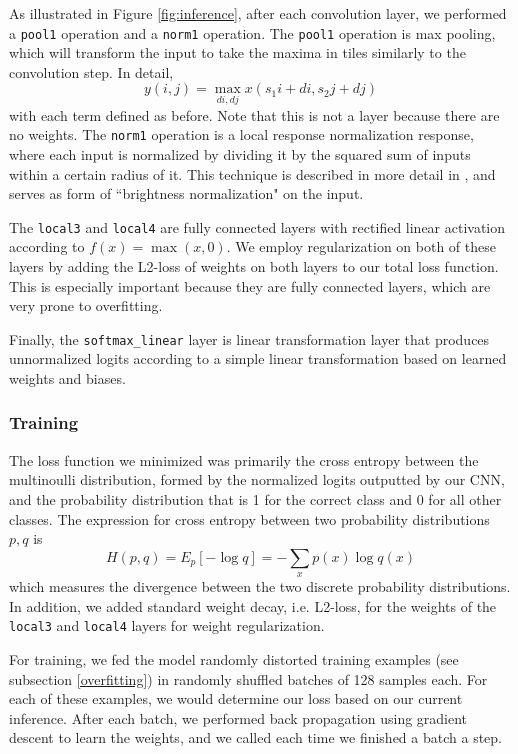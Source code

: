 \documentclass[11pt, twocolumn, twoside]{article}
\begin{document}
As illustrated in Figure \ref{fig:inference}, after each convolution layer, we performed a \texttt{pool1} operation and a \texttt{norm1} operation. The \texttt{pool1} operation is max pooling, which will transform the input to take the maxima in tiles similarly to the convolution step. In detail,
\[ y(i, j) = \max_{di, dj} x(s_1i + di, s_2j + dj)\]
with each term defined as before. Note that this is not a layer because there are no weights. The \texttt{norm1} operation is a local response normalization response, where each input is normalized by dividing it by the squared sum of inputs within a certain radius of it. This technique is described in more detail in \cite{Krizhevsky}, and serves as form of ``brightness normalization" on the input.

The \texttt{local3} and \texttt{local4} are fully connected layers with rectified linear activation according to $f(x) = \max(x, 0)$. We employ regularization on both of these layers by adding the L2-loss of weights on both layers to our total loss function. This is especially important because they are fully connected layers, which are very prone to overfitting.

Finally, the \texttt{softmax\_linear} layer is linear transformation layer that produces unnormalized logits according to a simple linear transformation based on learned weights and biases.

\subsubsection{Training}

The loss function we minimized was primarily the cross entropy between the multinoulli distribution, formed by the normalized logits outputted by our CNN, and the probability distribution that is 1 for the correct class and 0 for all other classes. The expression for cross entropy between two probability distributions $p, q$ is
\[H(p, q) = E_p[-\log q] = -\sum_x p(x)\log q(x)\]
which measures the divergence between the two discrete probability distributions. In addition, we added standard weight decay, i.e. L2-loss, for the weights of the \texttt{local3} and \texttt{local4} layers for weight regularization.

For training, we fed the model randomly distorted training examples (see subsection \ref{overfitting}) in randomly shuffled batches of 128 samples each. For each of these examples, we would determine our loss based on our current inference. After each batch, we performed back propagation using gradient descent to learn the weights, and we called each time we finished a batch a step. 
\end{document}
